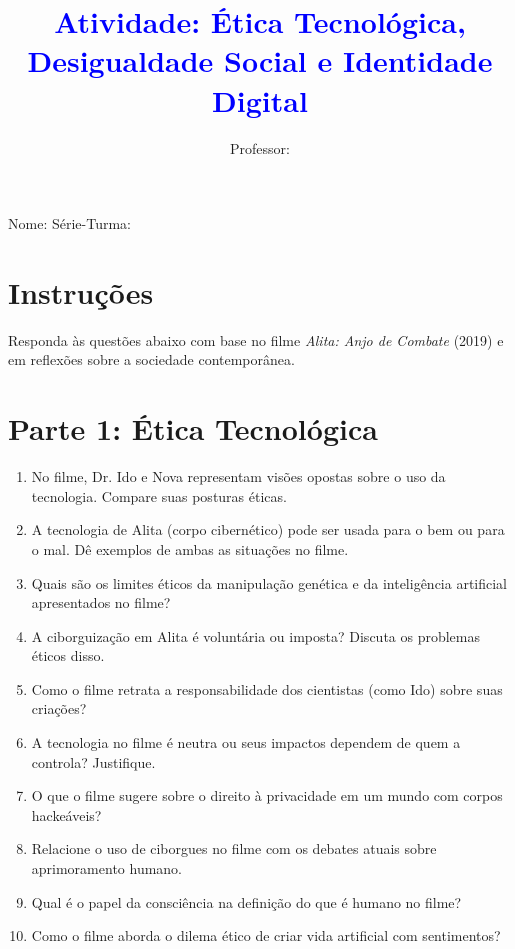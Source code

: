 \documentclass[12pt]{article}
\title{\textcolor{blue}{Atividade: Ética Tecnológica, Desigualdade Social e Identidade Digital}}
\author{Professor: \underline{\hspace{4cm}}}
\date{}
\begin{document}
\maketitle

\begin{center}
\large{Nome: \underline{\hspace{8cm}} \quad Série-Turma: \underline{\hspace{3cm}}}
\end{center}

\begin{multicols}{2}

\section*{Instruções}
Responda às questões abaixo com base no filme \textit{Alita: Anjo de Combate} (2019) e em reflexões sobre a sociedade contemporânea.

\section*{Parte 1: Ética Tecnológica}
\begin{enumerate}
    \item No filme, Dr. Ido e Nova representam visões opostas sobre o uso da tecnologia. Compare suas posturas éticas.
    \item A tecnologia de Alita (corpo cibernético) pode ser usada para o bem ou para o mal. Dê exemplos de ambas as situações no filme.
    \item Quais são os limites éticos da manipulação genética e da inteligência artificial apresentados no filme?
    \item A ciborguização em Alita é voluntária ou imposta? Discuta os problemas éticos disso.
    \item Como o filme retrata a responsabilidade dos cientistas (como Ido) sobre suas criações?
    \item A tecnologia no filme é neutra ou seus impactos dependem de quem a controla? Justifique.
    \item O que o filme sugere sobre o direito à privacidade em um mundo com corpos hackeáveis?
    \item Relacione o uso de ciborgues no filme com os debates atuais sobre aprimoramento humano.
    \item Qual é o papel da consciência na definição do que é humano no filme?
    \item Como o filme aborda o dilema ético de criar vida artificial com sentimentos?
\end{enumerate}


\end{multicols}
\end{document}
